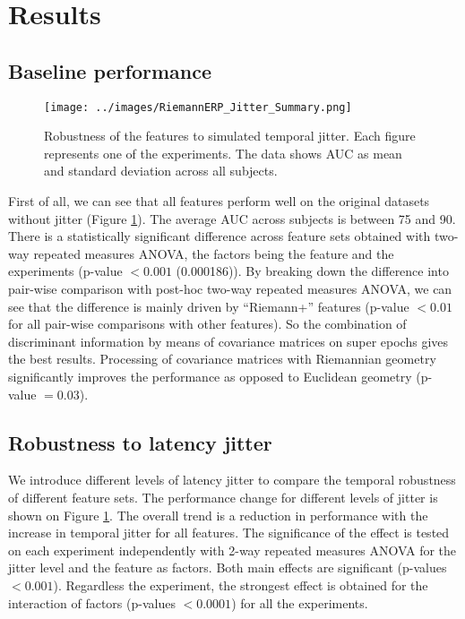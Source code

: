 \documentclass[12pt]{iopart}
\begin{document}
\section{Results}
\label{sec:results}

\subsection{Baseline performance}

\begin{figure}[!t]
    \texttt{[image: ../images/RiemannERP\_Jitter\_Summary.png]}
\caption{Robustness of the features to simulated temporal jitter.
    Each figure represents one of the experiments. The data shows
    AUC as mean and standard deviation across all subjects.}
\label{fig:jitter}
\end{figure}

First of all, we can see that all features perform well on the
original datasets without jitter (Figure \ref{fig:jitter}). The average AUC across subjects is between 75 and 90.
There is a statistically significant difference across feature sets obtained with two-way repeated
measures ANOVA, the factors being the feature and the experiments (p-value $< 0.001$
(0.000186)). By breaking down the difference into pair-wise comparison with post-hoc
two-way repeated measures ANOVA, we can see that the difference is mainly driven by
``Riemann+'' features (p-value $< 0.01$ for all pair-wise comparisons with other
features). So the combination of discriminant information by means
of covariance matrices on super epochs gives the best results. Processing of
covariance matrices with Riemannian geometry significantly improves the performance
as opposed to Euclidean geometry (p-value $= 0.03$).


\subsection{Robustness to latency jitter}

We introduce different levels of latency jitter to compare the temporal robustness
of different feature sets.
The performance change for different levels of jitter is shown on Figure \ref{fig:jitter}.
The overall trend is a reduction in performance with the increase in temporal jitter for all features.
The significance of the effect is tested on each experiment independently
with 2-way repeated measures ANOVA for the jitter level and the feature
as factors. Both main effects are significant (p-values $<0.001$). 
Regardless the experiment, the strongest effect is obtained for the interaction
of factors (p-values $< 0.0001$) for all the experiments.
\end{document}
